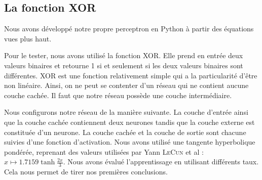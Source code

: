 \subsection{La fonction XOR}

Nous avons développé notre propre perceptron en Python à partir des équations vues plus haut.

Pour le tester, nous avons utilisé la fonction XOR. Elle prend en entrée deux valeurs binaires et retourne 1 si et seulement si les deux valeurs binaires sont différentes. XOR est une fonction relativement simple qui a la particularité d'être non linéaire. Ainsi, on ne peut se contenter d'un réseau qui ne contient aucune couche cachée. Il faut que notre réseau possède une couche intermédiaire.

Nous configurons notre réseau de la manière suivante. La couche d'entrée ainsi que la couche cachée contiennent deux neurones tandis que la couche externe est constituée d'un neurone. La couche cachée et la couche de sortie sont chacune suivies d'une fonction d'activation. Nous avons utilisé une tangente hyperbolique pondérée, reprenant des valeurs utilisées par Yann \textsc{LeCun} et al : $ x \mapsto 1.7159\tanh{\frac{2x}{3}}$. Nous avons évalué l'apprentissage en utilisant différents taux. Cela nous permet de tirer nos premières conclusions.

